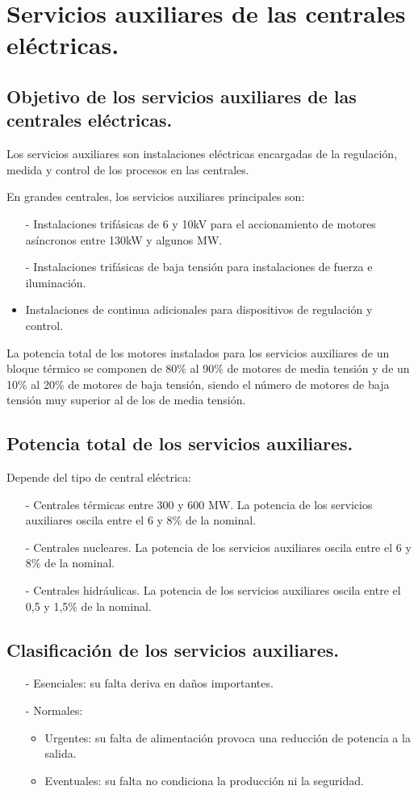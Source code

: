 \chapter{Servicios auxiliares de las centrales eléctricas.}
\section{Objetivo de los servicios auxiliares de las centrales eléctricas.}

Los servicios auxiliares son instalaciones eléctricas encargadas de la regulación, medida y control de los procesos en las centrales.



En grandes centrales, los servicios auxiliares principales son:
\begin{itemize}
	\item [-] Instalaciones trifásicas de 6 y 10kV para el accionamiento de motores asíncronos entre 130kW y algunos MW.
	\item [-] Instalaciones trifásicas de baja tensión para instalaciones de fuerza e iluminación.
	\item Instalaciones de continua adicionales para dispositivos de regulación y control.
\end{itemize}



La potencia total de los motores instalados para los servicios auxiliares de un bloque térmico se
componen de 80\% al 90\% de motores de media tensión y de un 10\% al 20\% de motores de baja
tensión, siendo el número de motores de baja tensión muy superior al de los de media tensión.
\section{Potencia total de los servicios auxiliares.}
Depende del tipo de central eléctrica:
\begin{itemize}
	\item [-] Centrales térmicas entre 300 y 600 MW. La potencia de los servicios auxiliares oscila entre el 6 y 8\% de la nominal.
	\item [-] Centrales nucleares. La potencia de los servicios auxiliares oscila entre el 6 y 8\% de la nominal.
	\item [-] Centrales hidráulicas. La potencia de los servicios auxiliares oscila entre el 0,5 y 1,5\% de la nominal.
\end{itemize}
\section{Clasificación de los servicios auxiliares.}
\begin{itemize}
	\item [-] Esenciales: su falta deriva en daños importantes.
	\item [-] Normales:
	\begin{itemize}
		\item Urgentes: su falta de alimentación provoca una reducción de potencia a la salida.
		\item Eventuales: su falta no condiciona la producción ni la seguridad.
	\end{itemize}
\end{itemize}
